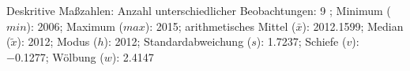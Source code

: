 				\label{tableValues:mres042b}
				\vspace*{-\baselineskip}
                    \begin{noten}
                	    \note{} Deskritive Maßzahlen:
                	    Anzahl unterschiedlicher Beobachtungen: 9%
                	    ; 
                	      Minimum ($min$): 2006; 
                	      Maximum ($max$): 2015; 
                	      arithmetisches Mittel ($\bar{x}$): \num[round-mode=places,round-precision=2]{2012,1599}; 
                	      Median ($\tilde{x}$): 2012; 
                	      Modus ($h$): 2012; 
                	      Standardabweichung ($s$): \num[round-mode=places,round-precision=2]{1,7237}; 
                	      Schiefe ($v$): \num[round-mode=places,round-precision=2]{-0,1277}; 
                	      Wölbung ($w$): \num[round-mode=places,round-precision=2]{2,4147}
                     \end{noten}


